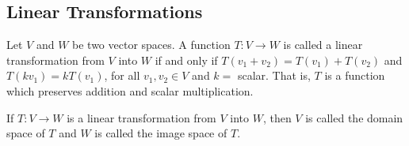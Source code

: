 \documentclass[12pt]{article}
\begin{document}
 \subsection{Linear Transformations} 
 \begin{definition} Let $V$ and $W$ be two vector spaces. A function $T: V \to W$ is called a linear transformation from $V$ into $W$ if and only if $T(v_1 + v_2) = T(v_1) + T(v_2)$ and $T(kv_1) = kT(v_1)$, for all $v_1, v_2 \in V$ and $k = $ scalar. That is, $T$ is a function which preserves addition and scalar multiplication. \end{definition} 
 \begin{definition} If $T: V \to W$ is a linear transformation from $V$ into $W$, then $V$ is called the domain space of $T$ and $W$ is called the image space of $T$. \end{definition} 
\end{document}
